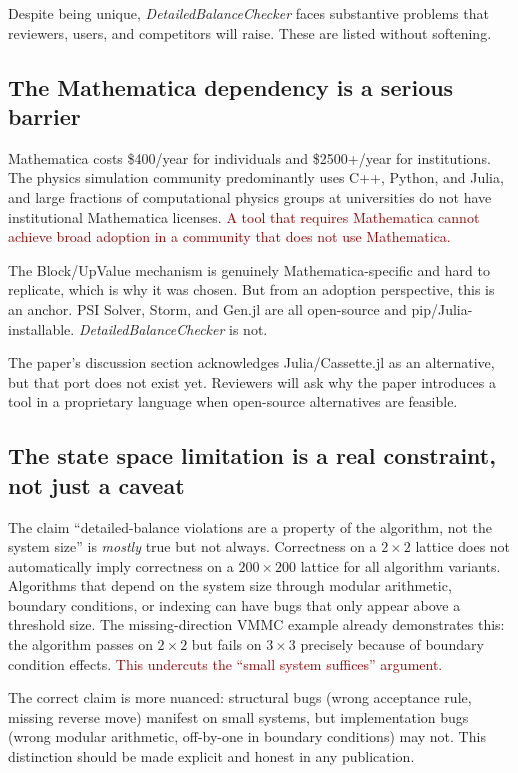 \documentclass[11pt,a4paper]{article}
\newcommand{\bad}[1]{\textcolor{darkred}{#1}}
\newcommand{\DBC}{\textit{DetailedBalanceChecker}}
\begin{document}
Despite being unique, \DBC{} faces substantive problems that reviewers, users,
and competitors will raise.  These are listed without softening.

\subsection{The Mathematica dependency is a serious barrier}

Mathematica costs \$400/year for individuals and \$2500+/year for institutions.
The physics simulation community predominantly uses C++, Python, and Julia, and
large fractions of computational physics groups at universities do not have
institutional Mathematica licenses.  \bad{A tool that requires Mathematica cannot
achieve broad adoption in a community that does not use Mathematica.}

The Block/UpValue mechanism is genuinely Mathematica-specific and hard to replicate,
which is why it was chosen.  But from an adoption perspective, this is an anchor.
PSI Solver, Storm, and Gen.jl are all open-source and pip/Julia-installable.
\DBC{} is not.

The paper's discussion section acknowledges Julia/Cassette.jl as an alternative,
but that port does not exist yet.  Reviewers will ask why the paper introduces a
tool in a proprietary language when open-source alternatives are feasible.

\subsection{The state space limitation is a real constraint, not just a caveat}

The claim ``detailed-balance violations are a property of the algorithm, not the
system size'' is \emph{mostly} true but not always.  Correctness on a $2\times2$
lattice does not automatically imply correctness on a $200\times200$ lattice for
all algorithm variants.  Algorithms that depend on the system size through modular
arithmetic, boundary conditions, or indexing can have bugs that only appear above
a threshold size.  The missing-direction VMMC example already demonstrates this:
the algorithm passes on $2\times2$ but fails on $3\times3$ precisely because of
boundary condition effects.  \bad{This undercuts the ``small system suffices''
argument.}

The correct claim is more nuanced: structural bugs (wrong acceptance rule, missing
reverse move) manifest on small systems, but implementation bugs (wrong modular
arithmetic, off-by-one in boundary conditions) may not.  This distinction should
be made explicit and honest in any publication.
\end{document}
